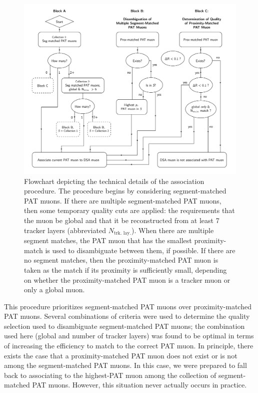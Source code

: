 \begin{figure}[p]
  \centering
  \includegraphics[width=\textwidth]{figures/displaced/ReplacementDiagram.pdf}
  \caption{Flowchart depicting the technical details of the \DSAToPAT association procedure. The procedure begins by considering segment-matched PAT muons. If there are multiple segment-matched PAT muons, then some temporary quality cuts are applied: the requirements that the muon be global and that it be reconstructed from at least 7 tracker layers (abbreviated $N_\text{trk. lay.}$). When there are multiple segment matches, the PAT muon that has the smallest proximity-match \deltaR is used to disambiguate between them, if possible. If there are no segment matches, then the proximity-matched PAT muon is taken as the match if its proximity \deltaR is sufficiently small, depending on whether the proximity-matched PAT muon is a tracker muon or only a global muon.}
  \label{fig:dd:repdiagram}
\end{figure}

This procedure prioritizes segment-matched PAT muons over proximity-matched PAT muons.
Several combinations of criteria were used to determine the quality selection used to disambiguate segment-matched PAT muons; the combination used here (global and number of tracker layers) was found to be optimal in terms of increasing the efficiency to match to the correct PAT muon.
In principle, there exists the case that a proximity-matched PAT muon does not exist or is not among the segment-matched PAT muons.
In this case, we were prepared to fall back to associating to the highest-\pT PAT muon among the collection of segment-matched PAT muons.
However, this situation never actually occurs in practice.

